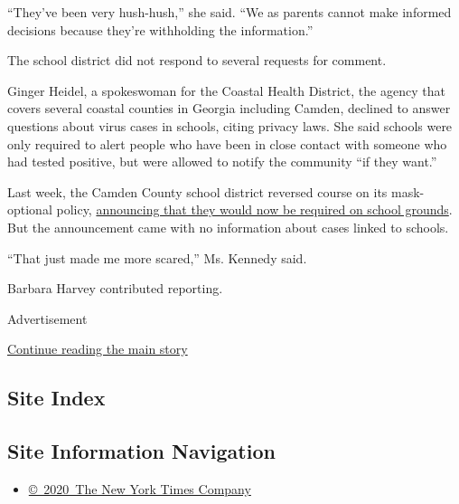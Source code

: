 ``They've been very hush-hush,'' she said. ``We as parents cannot make
informed decisions because they're withholding the information.''

The school district did not respond to several requests for comment.

Ginger Heidel, a spokeswoman for the Coastal Health District, the agency
that covers several coastal counties in Georgia including Camden,
declined to answer questions about virus cases in schools, citing
privacy laws. She said schools were only required to alert people who
have been in close contact with someone who had tested positive, but
were allowed to notify the community ``if they want.''

Last week, the Camden County school district reversed course on its
mask-optional policy, \href{http://www.camden.k12.ga.us/}{announcing
that they would now be required on school grounds}. But the announcement
came with no information about cases linked to schools.

``That just made me more scared,'' Ms. Kennedy said.

Barbara Harvey contributed reporting.

Advertisement

\protect\hyperlink{after-bottom}{Continue reading the main story}

\hypertarget{site-index}{%
\subsection{Site Index}\label{site-index}}

\hypertarget{site-information-navigation}{%
\subsection{Site Information
Navigation}\label{site-information-navigation}}

\begin{itemize}
\tightlist
\item
  \href{https://help.nytimes3xbfgragh.onion/hc/en-us/articles/115014792127-Copyright-notice}{©~2020~The
  New York Times Company}
\end{itemize}


